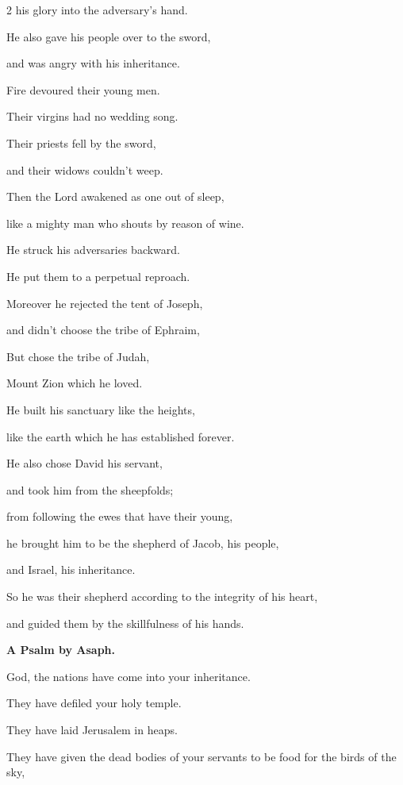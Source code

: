 \begin{multicols}{2}
	his glory into the adversary’s hand.
	
	
	\myverse{}He also gave his people over to the sword,
	
	and was angry with his inheritance.
	
	
	\myverse{}Fire devoured their young men.
	
	Their virgins had no wedding song.
	
	
	\myverse{}Their priests fell by the sword,
	
	and their widows couldn’t weep.
	
	
	\myverse{}Then the Lord awakened as one out of sleep,
	
	like a mighty man who shouts by reason of wine.
	
	
	\myverse{}He struck his adversaries backward.
	
	He put them to a perpetual reproach.
	
	
	\myverse{}Moreover he rejected the tent of Joseph,
	
	and didn’t choose the tribe of Ephraim,
	
	
	\myverse{}But chose the tribe of Judah,
	
	Mount Zion which he loved.
	
	
	\myverse{}He built his sanctuary like the heights,
	
	like the earth which he has established forever.
	
	
	\myverse{}He also chose David his servant,
	
	and took him from the sheepfolds;
	
	
	\myverse{}from following the ewes that have their young,
	
	he brought him to be the shepherd of Jacob, his people,
	
	and Israel, his inheritance.
	
	
	\myverse{}So he was their shepherd according to the integrity of his
	heart,
	
	and guided them by the skillfulness of his hands.
	
	
	
	\mychapter{}\textbf{A Psalm by Asaph.}
	
	\quad \myverse*{}God, the nations have come into your inheritance.
	
	They have defiled your holy temple.
	
	They have laid Jerusalem in heaps.
	
	
	\myverse{}They have given the dead bodies of your servants to be food for
	the birds of the sky,
	

\end{multicols}
